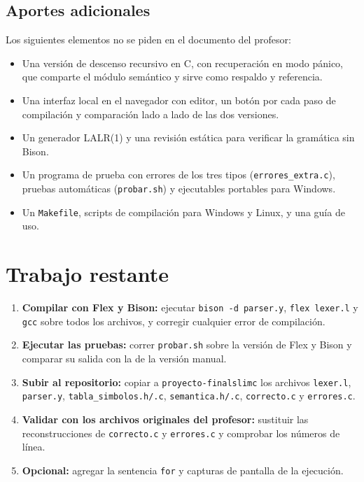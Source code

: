 \documentclass[runningheads]{llncs}
\begin{document}
\subsection{Aportes adicionales}
Los siguientes elementos no se piden en el documento del profesor:
\begin{itemize}
\item Una versión de descenso recursivo en C, con recuperación en modo pánico, que comparte el módulo semántico y sirve como respaldo y referencia.
\item Una interfaz local en el navegador con editor, un botón por cada paso de compilación y comparación lado a lado de las dos versiones.
\item Un generador LALR(1) y una revisión estática para verificar la gramática sin Bison.
\item Un programa de prueba con errores de los tres tipos (\texttt{errores\_extra.c}), pruebas automáticas (\texttt{probar.sh}) y ejecutables portables para Windows.
\item Un \texttt{Makefile}, scripts de compilación para Windows y Linux, y una guía de uso.
\end{itemize}

\section{Trabajo restante}
\begin{enumerate}
\item \textbf{Compilar con Flex y Bison:} ejecutar \texttt{bison -d parser.y}, \texttt{flex lexer.l} y \texttt{gcc} sobre todos los archivos, y corregir cualquier error de compilación.
\item \textbf{Ejecutar las pruebas:} correr \texttt{probar.sh} sobre la versión de Flex y Bison y comparar su salida con la de la versión manual.
\item \textbf{Subir al repositorio:} copiar a \texttt{proyecto-finalslimc} los archivos \texttt{lexer.l}, \texttt{parser.y}, \texttt{tabla\_simbolos.h/.c}, \texttt{semantica.h/.c}, \texttt{correcto.c} y \texttt{errores.c}.
\item \textbf{Validar con los archivos originales del profesor:} sustituir las reconstrucciones de \texttt{correcto.c} y \texttt{errores.c} y comprobar los números de línea.
\item \textbf{Opcional:} agregar la sentencia \texttt{for} y capturas de pantalla de la ejecución.
\end{enumerate}
\end{document}
